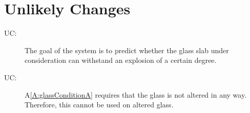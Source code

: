 \documentclass[12pt]{article}
\newcounter{ucnum}
\newcommand{\uctheucnum}{UC\theucnum}
\begin{document}
\section{Unlikely Changes}
\label{Sec:UCs}
\begin{description}
\item[\uctheucnum\label{UC:unlikelychg1}:]The goal of the system is to predict whether the glass slab under consideration can withstand an explosion of a certain degree.
\end{description}
\begin{description}
\item[\uctheucnum\label{UC:unlikelychg2}:]A\ref{A:glassConditionA} requires that the glass is not altered in any way. Therefore, this cannot be used on altered glass.
\end{description}
\end{document}
